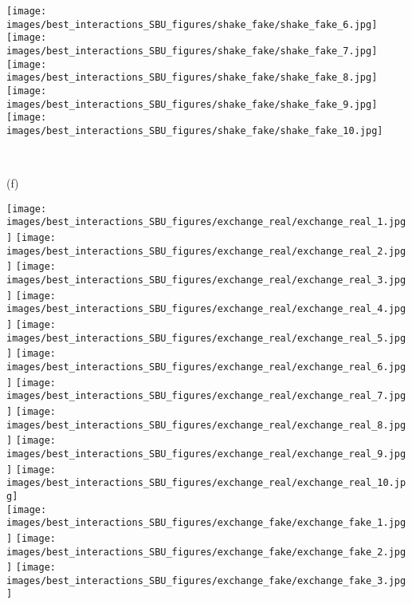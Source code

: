 \documentclass[times,twocolumn,final]{elsarticle}
\begin{document}
\begin{figure*}
\begin{minipage}{0.9\textwidth}
  \hfill 
  \texttt{[image: images/best\_interactions\_SBU\_figures/shake\_fake/shake\_fake\_6.jpg]}
  \hfill 
  \texttt{[image: images/best\_interactions\_SBU\_figures/shake\_fake/shake\_fake\_7.jpg]}
  \hfill 
  \texttt{[image: images/best\_interactions\_SBU\_figures/shake\_fake/shake\_fake\_8.jpg]}
  \hfill 
  \texttt{[image: images/best\_interactions\_SBU\_figures/shake\_fake/shake\_fake\_9.jpg]}
  \hfill 
  \texttt{[image: images/best\_interactions\_SBU\_figures/shake\_fake/shake\_fake\_10.jpg]}
  \hfill
    \end{minipage}\\
    \begin{minipage}{0.08\textwidth}
       (f)\quad{}%
    \end{minipage}
    \begin{minipage}{0.9\textwidth}
  \texttt{[image: images/best\_interactions\_SBU\_figures/exchange\_real/exchange\_real\_1.jpg]}
  \hfill
  \texttt{[image: images/best\_interactions\_SBU\_figures/exchange\_real/exchange\_real\_2.jpg]}
  \hfill
  \texttt{[image: images/best\_interactions\_SBU\_figures/exchange\_real/exchange\_real\_3.jpg]}
  \hfill
  \texttt{[image: images/best\_interactions\_SBU\_figures/exchange\_real/exchange\_real\_4.jpg]}
  \hfill
  \texttt{[image: images/best\_interactions\_SBU\_figures/exchange\_real/exchange\_real\_5.jpg]}
  \hfill
  \texttt{[image: images/best\_interactions\_SBU\_figures/exchange\_real/exchange\_real\_6.jpg]}
  \hfill
  \texttt{[image: images/best\_interactions\_SBU\_figures/exchange\_real/exchange\_real\_7.jpg]}
  \hfill
  \texttt{[image: images/best\_interactions\_SBU\_figures/exchange\_real/exchange\_real\_8.jpg]}
  \hfill
  \texttt{[image: images/best\_interactions\_SBU\_figures/exchange\_real/exchange\_real\_9.jpg]}
  \hfill
  \texttt{[image: images/best\_interactions\_SBU\_figures/exchange\_real/exchange\_real\_10.jpg]}
  \hfill \\
  \texttt{[image: images/best\_interactions\_SBU\_figures/exchange\_fake/exchange\_fake\_1.jpg]}
  \hfill
  \texttt{[image: images/best\_interactions\_SBU\_figures/exchange\_fake/exchange\_fake\_2.jpg]}
  \hfill
  \texttt{[image: images/best\_interactions\_SBU\_figures/exchange\_fake/exchange\_fake\_3.jpg]}

\end{minipage}
\end{figure*}
\end{document}
